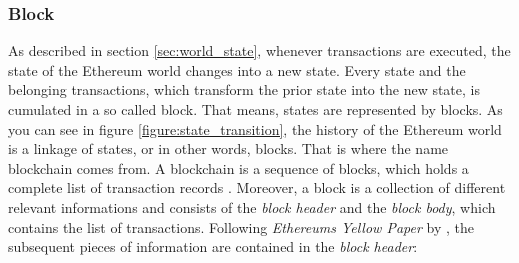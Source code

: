 \subsubsection{Block} 
\label{sec:block}
As described in section \ref{sec:world_state}, whenever transactions are executed, the state of the Ethereum world changes into a new state. Every state and the belonging transactions, which transform the prior state into the new state, is cumulated in a so called block. That means, states are represented by blocks. As you can see in figure \ref{figure:state_transition}, the history of the Ethereum world is a linkage of states, or in other words, blocks. That is where the name blockchain comes from. A blockchain is a sequence of blocks, which holds a complete list of transaction records . 
Moreover, a block is a collection of different relevant informations and consists of the \textit{block header} and the \textit{block body}, which contains the list of transactions. Following \textit{Ethereums Yellow Paper} by , the subsequent pieces of information are contained in the \textit{block header}:

